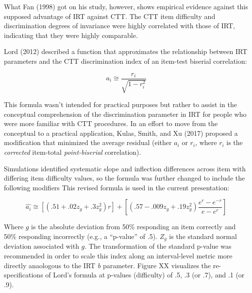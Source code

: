 \documentclass[
  english,
  man]{apa6}
\begin{document}
What Fan (1998) got on his study, however, shows empirical evidence against this supposed advantage of IRT against CTT. The CTT item difficulty and discrimination degrees of invariance were highly correlated with those of IRT, indicating that they were highly comparable.

Lord (2012) described a function that approximates the relationship between IRT parameters and the CTT discrimination index of an item-test biserial correlation:

\[a_i\cong \frac{r_i}{\sqrt{1-r_i^2}}\]

This formula wasn't intended for practical purposes but rather to assist in the conceptual comprehension of the discrimination parameter in IRT for people who were more familiar with CTT procedures. In an effort to move from the conceptual to a practical application, Kulas, Smith, and Xu (2017) proposed a modification that minimized the average residual (either \(a_i\) or \(r_i\), where \(r_i\) is the \emph{corrected} item-total \emph{point-biserial} correlation).

Simulations identified systematic slope and inflection differences across item with differing item difficulty values, so the formula was further changed to include the following modifiers This revised formula is used in the current presentation:

\[\hat{a_i}\cong[(.51 + .02z_g + .3z_g^2)r]+[(.57 - .009z_g + .19z_g^2)\frac{e^r-e^{-r}}{e-e^r}]\]

Where \(g\) is the absolute deviation from 50\% responding an item correctly and 50\% responding incorrectly (e.g., a ``p-value'' of .5). \(Z_g\) is the standard normal deviation associated with \(g\). The transformation of the standard p-value was recommended in order to scale this index along an interval-level metric more directly anaologous to the IRT \emph{b} parameter. Figure XX visualizes the re-specifications of Lord's formula at p-values (difficulty) of .5, .3 (or .7), and .1 (or .9).
\end{document}
